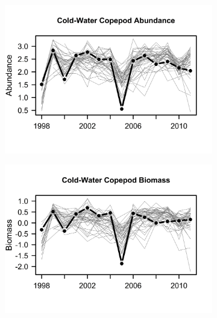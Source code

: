 \documentclass[preprint, authoryear, 12pt]{elsarticle}
\begin{document}
\begin{figure}
\centering
\begin{subfigure}{0.45\textwidth}
  \centering
  \includegraphics[width = 1\linewidth]{images/nor_abu.jpg}
  \caption{}
  \label{fig:cold_abu}
\end{subfigure}
\begin{subfigure}{0.45\textwidth}
  \centering
  \includegraphics[width = 1\linewidth]{images/nor_bio.jpg}
  \caption{}
  \label{fig:cold_bio}
\end{subfigure} \\
\begin{subfigure}{0.45\textwidth}
  \centering

\end{subfigure}
\end{figure}
\end{document}

